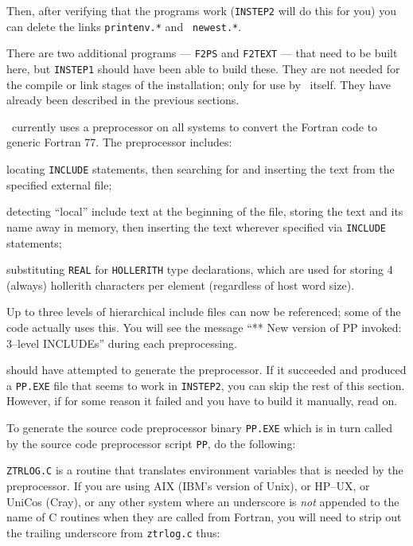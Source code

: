 \noindent Then, after verifying that the programs work ({\tt INSTEP2}
will do this for you) you can delete the links {\tt printenv.*} and {\tt
newest.*}.

There are two additional programs --- {\tt F2PS} and {\tt F2TEXT} --- that
need to be built here, but {\tt INSTEP1} should have been able to build
these.  They are not needed for the compile or link stages of the
installation; only for use by \AIPS\ itself.  They have already been
described in the previous sections.

\medskip{}

\AIPS\ currently uses a preprocessor on all systems to convert the
Fortran code to generic Fortran 77.  The preprocessor includes:
\medskip

\item\bul locating {\tt INCLUDE} statements, then searching for
        and inserting the text from the specified external file;
\item\bul detecting ``local'' include text at the beginning of
        the file, storing the text and its name away in memory, then
        inserting the text wherever specified via {\tt INCLUDE}
        statements;
\item\bul substituting {\tt REAL} for {\tt HOLLERITH} type
        declarations, which are used for storing 4 (always) hollerith
        characters per element (regardless of host word size).
\item\bul Up to three levels of hierarchical
        include files can now be referenced; some of the code actually
        uses this.  You will see the message ``** New version of PP
        invoked: 3--level INCLUDEs'' during each preprocessing.
\medskip

 should have attempted to generate the
preprocessor.  If it succeeded and produced a {\tt PP.EXE} file that
seems to work in {\tt INSTEP2}, you can skip the rest of this section.
However, if for some reason it failed and you have to build it
manually, read on.

To generate the source code preprocessor binary {\tt PP.EXE} which is
in turn called by the source code preprocessor script {\tt PP}, do the
following:\medskip


\medskip\noindent
{\tt ZTRLOG.C} is a routine that translates environment variables that
is needed by the preprocessor.  If you are using AIX (IBM's version of
Unix), or HP--UX, or UniCos (Cray), or any other system where an
underscore is {\it not\/} appended to the name of C routines when they
are called from Fortran, you will need to strip out the trailing
underscore from {\tt ztrlog.c} thus:\medskip

